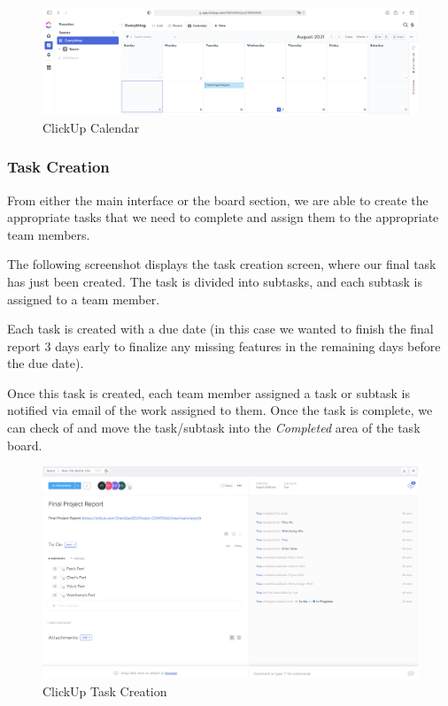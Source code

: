 \documentclass[12pt, letterpaper]{article}
\begin{document}
\begin{figure}[htbp]
	\centering
	\includegraphics[width=\textwidth]{images/29-clickup-calendar.png}
	\caption{ClickUp Calendar}
\end{figure}

\newpage
\subsubsection*{Task Creation}
From either the main interface or the board section, we are able to create the appropriate tasks that we need to complete and assign them to the appropriate team members.

The following screenshot displays the task creation screen, where our final task has just been created. The task is divided into subtasks, and each subtask is assigned to a team member. 

Each task is created with a due date (in this case we wanted to finish the final report 3 days early to finalize any missing features in the remaining days before the due date).

Once this task is created, each team member assigned a task or subtask is notified via email of the work assigned to them. Once the task is complete, we can check of and move the task/subtask into the \textit{Completed} area of the task board.

\begin{figure}[htbp]
	\centering
	\includegraphics[width=\textwidth]{images/29-clickup-task-creation.png}
	\caption{ClickUp Task Creation}
\end{figure}
\end{document}
